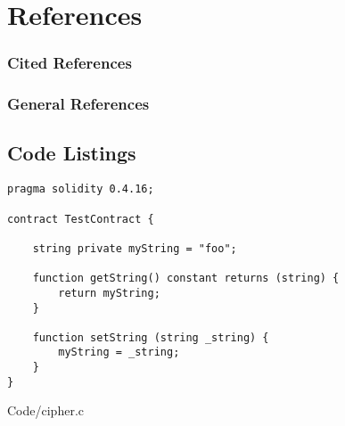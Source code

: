 \documentclass[12pt,tightenlines,letterpaper,listof=totoc]{scrartcl}
\begin{document}

\section{References}
\subsubsection*{Cited References}
\printbibliography[heading=none,category=cited]

\subsubsection*{General References}
\printbibliography[heading=none,notcategory=cited] 
\linespread{1}

\begin{appendices}
\section{Code Listings}
\begin{lstlisting}[language=Solidity,caption=Example of Solidity Code]
pragma solidity 0.4.16;

contract TestContract {
    
	string private myString = "foo";
	
	function getString() constant returns (string) {
	    return myString;
	}
	
	function setString (string _string) {
	    myString = _string;
	}
}
\end{lstlisting}

{Code/cipher.c}

\end{appendices}
\end{document}
